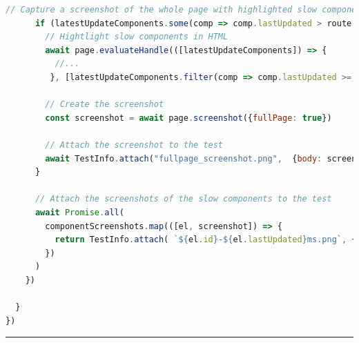 \documentclass[a4paper, 12pt]{article}
\begin{document}
\begin{lstlisting}[caption={Test file for component load times}, label={lst:dynamic-performance-spec}, language=JavaScript, escapechar=°]
      // Capture a screenshot of the whole page with highlighted slow components
      if (latestUpdateComponents.some(comp => comp.lastUpdated > route.pageLoadBudgetMs)){
        // Hightlight slow components in HTML
        await page.evaluateHandle(([latestUpdateComponents]) => {
          //...
         }, [latestUpdateComponents.filter(comp => comp.lastUpdated >= route.pageLoadBudgetMs)])

        // Create the screenshot
        const screenshot = await page.screenshot({fullPage: true})

        // Attach the screenshot to the test
        await TestInfo.attach("fullpage_screenshot.png",  {body: screenshot, contentType: 'image/png'})
      }

      // Attach the screenshots of the slow components to the test
      await Promise.all(
        componentScreenshots.map(([el, screenshot]) => {
          return TestInfo.attach( `${el.id}-${el.lastUpdated}ms.png`, {body: screenshot, contentType: 'image/png'})
        })
      )
    })

  }
})
\end{lstlisting}
\hrule
\end{document}
